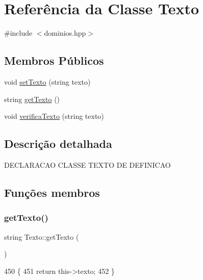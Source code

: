 \hypertarget{class_texto}{}\section{Referência da Classe Texto}
\label{class_texto}


{\ttfamily \#include $<$dominios.\+hpp$>$}

\subsection*{Membros Públicos}
\begin{DoxyCompactItemize}
\item 
void \mbox{\hyperlink{class_texto_a004feae9e66adbde822d3c7738b8fbba}{set\+Texto}} (string texto)
\item 
string \mbox{\hyperlink{class_texto_a4765daf4056dbd736344b9b18728e0a0}{get\+Texto}} ()
\item 
void \mbox{\hyperlink{class_texto_a458031559654ecec7e2926f1946494e4}{verifica\+Texto}} (string texto)
\end{DoxyCompactItemize}


\subsection{Descrição detalhada}
D\+E\+C\+L\+A\+R\+A\+C\+AO C\+L\+A\+S\+SE T\+E\+X\+TO DE D\+E\+F\+I\+N\+I\+C\+AO 

\subsection{Funções membros}
\mbox{\label{class_texto_a4765daf4056dbd736344b9b18728e0a0}} 
\subsubsection{\texorpdfstring{get\+Texto()}{getTexto()}}
{\footnotesize\ttfamily string Texto\+::get\+Texto (\begin{DoxyParamCaption}{ }\end{DoxyParamCaption})}


\begin{DoxyCode}
450 \{
451   \textcolor{keywordflow}{return} this->texto;
452 \}
\end{DoxyCode}
\mbox{\label{class_texto_a004feae9e66adbde822d3c7738b8fbba}} 
